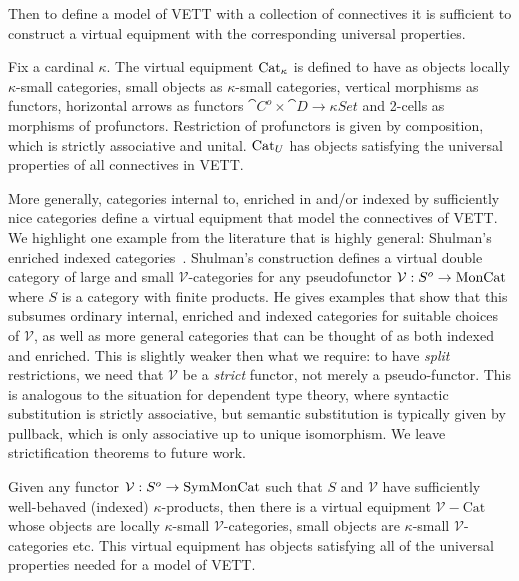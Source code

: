 \documentclass{llncs}
\begin{document}
%

Then to define a model of VETT with a collection of connectives it is
sufficient to construct a virtual equipment with the corresponding
universal properties.
%
\begin{construction}
  Fix a cardinal $\kappa$. The virtual equipment $\textrm{Cat}_{\kappa}$ is
  defined to have as objects locally $\kappa$-small categories, small
  objects as $\kappa$-small categories, vertical morphisms as functors,
  horizontal arrows as functors $\cat C^o \times \cat D \to \kappa Set$ and
  2-cells as morphisms of profunctors. Restriction of profunctors is
  given by composition, which is strictly associative and unital.
  $\textrm{Cat}_{U}$ has objects satisfying the universal properties of all
  connectives in VETT.
\end{construction}

More generally, categories internal to, enriched in and/or indexed by
sufficiently nice categories define a virtual equipment that model the
connectives of VETT. We highlight one example from the literature that
is highly general: Shulman's enriched indexed
categories~\cite{Shulman13}. Shulman's construction defines a virtual
double category of large and small $\mathcal V$-categories for any
pseudofunctor $\mathcal V : S^o \to \textrm{MonCat}$ where $S$ is a category
with finite products. He gives examples that show that this subsumes
ordinary internal, enriched and indexed categories for suitable choices
of $\mathcal V$, as well as more general categories that can be thought
of as both indexed and enriched.
%
This is slightly weaker then what we require: to have
\emph{split} restrictions, we need that $\mathcal V$ be a
\emph{strict} functor, not merely a pseudo-functor.
%
This is analogous to the situation for dependent type theory, where
syntactic substitution is strictly associative, but semantic
substitution is typically given by pullback, which is only associative
up to unique isomorphism.
%
We leave strictification theorems to future work.  

\begin{construction}
  Given any functor $\mathcal V : S^o \to \textrm{SymMonCat}$ such that $S$
  and $\mathcal V$ have sufficiently well-behaved (indexed)
  $\kappa$-products, then there is a virtual equipment $\mathcal
  V-\textrm{Cat}$ whose objects are locally $\kappa$-small $\mathcal
  V$-categories, small objects are $\kappa$-small $\mathcal
  V$-categories etc. This virtual equipment has objects satisfying all
  of the universal properties needed for a model of VETT.
\end{construction}
\end{document}
